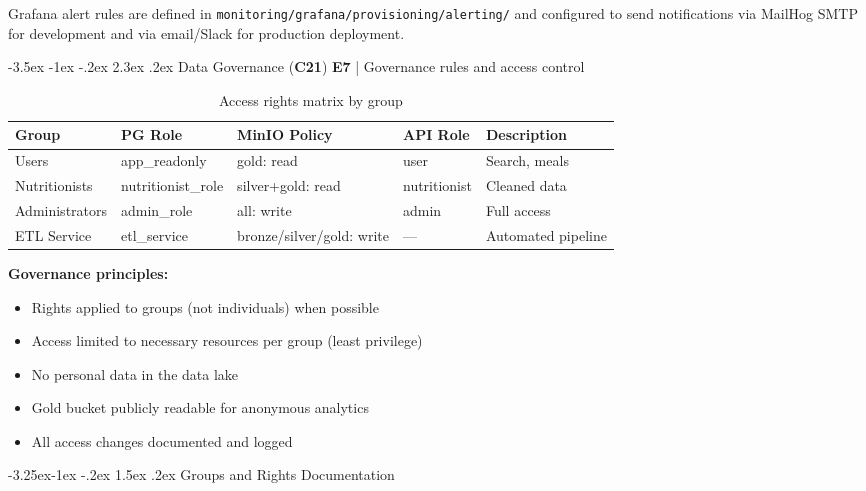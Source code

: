 \documentclass[a4paper,11pt,oneside,openany]{report}
\makeatletter
\renewcommand\section{\@startsection{section}{1}{\z@}%
  {-3.5ex \@plus -1ex \@minus -.2ex}%
  {2.3ex \@plus.2ex}%
  {\normalfont\Large\bfseries\color{ntgreen}}}
\renewcommand\subsection{\@startsection{subsection}{2}{\z@}%
  {-3.25ex\@plus -1ex \@minus -.2ex}%
  {1.5ex \@plus .2ex}%
  {\normalfont\large\bfseries\color{ntdarkgreen}}}
\newcommand{\competence}[1]{\textbf{\textcolor{ntgreen}{#1}}}
\newcommand{\evaluation}[1]{\textbf{\textcolor{ntblue}{#1}}}
\makeatother
\begin{document}
Grafana alert rules are defined in \texttt{monitoring/grafana/provisioning/alerting/}
and configured to send notifications via MailHog SMTP for development
and via email/Slack for production deployment.


\section{Data Governance (\competence{C21})}
\label{sec:c21}
{\small\evaluation{E7} | Governance rules and access control}

\begin{table}[H]
\centering
\caption{Access rights matrix by group}
\label{tab:access-matrix}
\begin{tabularx}{\textwidth}{L{2.5cm} L{2.5cm} L{3.5cm} C{1.5cm} L{3cm}}
\toprule
\textbf{Group} & \textbf{PG Role} & \textbf{MinIO Policy} & \textbf{API Role} & \textbf{Description} \\
\midrule
Users & app\_readonly & gold: read & user & Search, meals \\
Nutritionists & nutritionist\_role & silver+gold: read & nutritionist & Cleaned data \\
Administrators & admin\_role & all: write & admin & Full access \\
ETL Service & etl\_service & bronze/silver/gold: write & --- & Automated pipeline \\
\bottomrule
\end{tabularx}
\end{table}

\textbf{Governance principles:}
\begin{itemize}[nosep]
  \item Rights applied to groups (not individuals) when possible
  \item Access limited to necessary resources per group (least privilege)
  \item No personal data in the data lake
  \item Gold bucket publicly readable for anonymous analytics
  \item All access changes documented and logged
\end{itemize}

\subsection{Groups and Rights Documentation}
\end{document}
